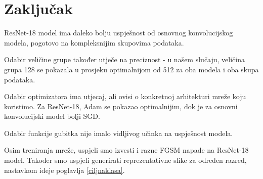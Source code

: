 \chapter{Zaključak}

ResNet-18 model ima daleko bolju uspješnost od osnovnog konvolucijskog modela, pogotovo na kompleksnijim skupovima podataka.

Odabir veličine grupe također utječe na preciznost - u našem slučaju, veličina grupa 128 se pokazala u prosjeku optimalnijom od 512 za oba modela i oba skupa podataka.

Odabir optimizatora ima utjecaj, ali ovisi o konkretnoj arhitekturi mreže koju koristimo. Za ResNet-18, Adam se pokazao optimalnijim, dok je za osnovni konvolucijski model bolji SGD.

Odabir funkcije gubitka nije imalo vidljivog učinka na uspješnost modela.

Osim treniranja mreže, uspjeli smo izvesti i razne FGSM napade na ResNet-18 model. Također smo uspjeli generirati reprezentativne slike za određen razred, nastavkom ideje poglavlja \ref{ciljnaklasa}.